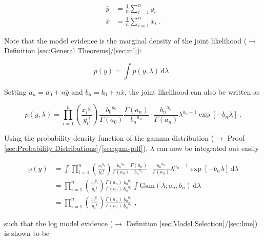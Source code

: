 \documentclass[a4paper,12pt,twoside]{book}
\begin{document}
\begin{equation} \label{eq:poissexp-lme-xy-mean}
\begin{split}
\bar{y} &= \frac{1}{n} \sum_{i=1}^n y_i \\
\bar{x} &= \frac{1}{n} \sum_{i=1}^n x_i \; .
\end{split}
\end{equation}

Note that the model evidence is the marginal density of the joint likelihood ($\rightarrow$ Definition \ref{sec:General Theorems}/\ref{sec:ml}):

\begin{equation} \label{eq:poissexp-lme-Poiss-exp-ME}
p(y) = \int p(y,\lambda) \, \mathrm{d}\lambda \; .
\end{equation}

Setting $a_n = a_0 + n \bar{y}$ and $b_n = b_0 + n \bar{x}$, the joint likelihood can also be written as

\begin{equation} \label{eq:poissexp-lme-Poiss-exp-JL-s3}
p(y,\lambda) = \prod_{i=1}^n \left(\frac{ {x_i}^{y_i}}{y_i !}\right) \frac{ {b_0}^{a_0}}{\Gamma(a_0)} \frac{\Gamma(a_n)}{ {b_n}^{a_n}} \cdot \frac{ {b_n}^{a_n}}{\Gamma(a_n)} \lambda^{a_n-1} \exp\left[-b_n \lambda\right] \; .
\end{equation}

Using the probability density function of the gamma distribution ($\rightarrow$ Proof \ref{sec:Probability Distributions}/\ref{sec:gam-pdf}), $\lambda$ can now be integrated out easily

\begin{equation} \label{eq:poissexp-lme-Poiss-exp-ME-qed}
\begin{split}
\mathrm{p}(y) &= \int \prod_{i=1}^n \left(\frac{ {x_i}^{y_i}}{y_i !}\right) \frac{ {b_0}^{a_0}}{\Gamma(a_0)} \frac{\Gamma(a_n)}{ {b_n}^{a_n}} \cdot \frac{ {b_n}^{a_n}}{\Gamma(a_n)} \lambda^{a_n-1} \exp\left[-b_n \lambda\right] \, \mathrm{d}\lambda \\
&= \prod_{i=1}^n \left(\frac{ {x_i}^{y_i}}{y_i !}\right) \frac{\Gamma(a_n)}{\Gamma(a_0)} \frac{ {b_0}^{a_0}}{ {b_n}^{a_n}} \int \mathrm{Gam}(\lambda; a_n, b_n) \, \mathrm{d}\lambda \\
&= \prod_{i=1}^n \left(\frac{ {x_i}^{y_i}}{y_i !}\right) \frac{\Gamma(a_n)}{\Gamma(a_0)} \frac{ {b_0}^{a_0}}{ {b_n}^{a_n}} \; ,
\end{split}
\end{equation}

such that the log model evidence ($\rightarrow$ Definition \ref{sec:Model Selection}/\ref{sec:lme}) is shown to be
\end{document}
